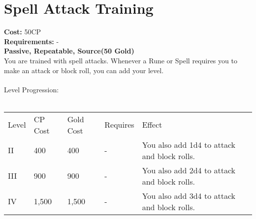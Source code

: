 \section{Spell Attack Training}\label{perk:spellAttackTraining}
\textbf{Cost:} 50CP\\
\textbf{Requirements:} -\\
\textbf{Passive, Repeatable, Source(50 Gold)}\\
You are trained with spell attacks.
Whenever a Rune or Spell requires you to make an attack or block roll, you can add your level.\\
\\
Level Progression:\\
\\
\begin{tabular}{l | l | l | l | l}
	Level & CP Cost & Gold Cost & Requires & Effect\\
	II & 400 & 400 & - & You also add 1d4 to attack and block rolls.\\
	III & 900 & 900 & - & You also add 2d4 to attack and block rolls.\\
	IV & 1,500 & 1,500 & - & You also add 3d4 to attack and block rolls.\\
\end{tabular}